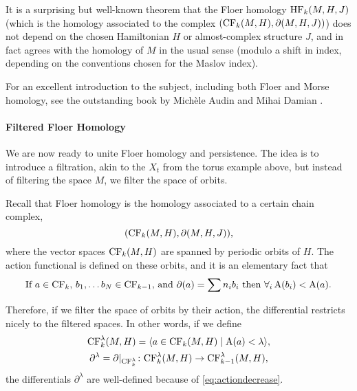 It is a surprising but well-known theorem that the Floer homology $\mathrm{HF}_k(M,H,J)$ (which is the homology associated to the complex $(\mathrm{CF}_k(M,H), \partial(M,H,J))$) does not depend on the chosen Hamiltonian $H$ or almost-complex structure $J$, and in fact agrees with the homology of $M$ in the usual sense (modulo a shift in index, depending on the conventions chosen for the Maslov index).

For an excellent introduction to the subject, including both Floer and Morse homology, see the outstanding book by Michèle Audin and Mihai Damian \cite{audin}.

\paragraph{Filtered Floer Homology}

We are now ready to unite Floer homology and persistence. The idea is to introduce a filtration, akin to the $X_t$ from the torus example above, but instead of filtering the space $M$, we filter the space of orbits.

Recall that Floer homology is the homology associated to a certain chain complex,
\begin{equation}
(\mathrm{CF}_k(M,H), \partial(M,H,J)),
\end{equation}
where the vector spaces $\mathrm{CF}_k(M,H)$ are spanned by periodic orbits of $H$. The action functional is defined on these orbits, and it is an elementary fact that
\begin{equation}\label{eq:actiondecrease}
\text{If $a \in \mathrm{CF}_k$, $b_1, \dots b_N \in \mathrm{CF}_{k-1}$, and } \partial(a) = \sum n_i b_i \text{ then } \forall_i \, \mathrm{A}(b_i) < \mathrm{A}(a).
\end{equation}

Therefore, if we filter the space of orbits by their action, the differential restricts nicely to the filtered spaces. In other words, if we define
\begin{equation}
\begin{gathered}
\mathrm{CF}_k^\lambda(M,H) = \langle a \in \mathrm{CF}_k(M,H) \mid \mathrm{A}(a) < \lambda\rangle,\\
\partial^\lambda = \partial|_{\mathrm{CF}_k^\lambda} \colon \mathrm{CF}_k^\lambda(M,H) \to \mathrm{CF}_{k-1}^\lambda(M,H),
\end{gathered}
\end{equation}
the differentials $\partial^\lambda$ are well-defined because of \eqref{eq:actiondecrease}.

